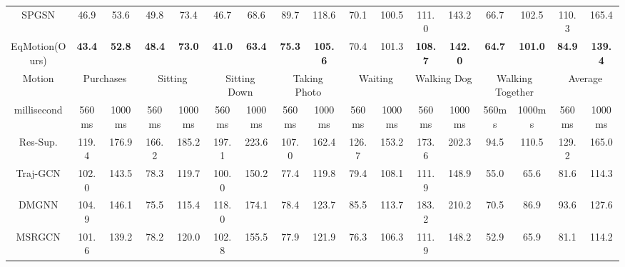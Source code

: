 \documentclass[10pt,twocolumn,letterpaper]{article}
\begin{document}
\begin{table*}[ht]
{\begin{tabular}{c|cc|cc|cc|cc|cc|cc|cc|cc}
SPGSN &46.9 &53.6& 49.8& {73.4}& 46.7 &68.6& 89.7& 118.6& 70.1& 100.5& 111.0& {143.2}& 66.7& 102.5& 110.3& 165.4 \\
EqMotion(Ours)  &\textbf{43.4} &\textbf{52.8}& \textbf{48.4}& \textbf{73.0}& \textbf{41.0} &\textbf{63.4}& \textbf{75.3}&\textbf{105.6}&70.4&101.3&\textbf{108.7}&\textbf{142.0}&\textbf{64.7}&\textbf{101.0} &\textbf{84.9}&\textbf{139.4}\\\hline
Motion          & \multicolumn{2}{c|}{Purchases}  & \multicolumn{2}{c|}{Sitting}    & \multicolumn{2}{c|}{Sitting Down} & \multicolumn{2}{c|}{Taking Photo} & \multicolumn{2}{c|}{Waiting}    & \multicolumn{2}{c|}{Walking Dog}  & \multicolumn{2}{c|}{Walking Together} & \multicolumn{2}{c}{Average}     \\ \hline
millisecond        & 560ms         & 1000ms         & 560ms         & 1000ms         & 560ms          & 1000ms         & 560ms          & 1000ms         & 560ms         & 1000ms         & 560ms          & 1000ms         & 560ms            & 1000ms           & 560ms          & 1000ms         \\ \hline
Res-Sup.          & 119.4         & 176.9          & 166.2         & 185.2          & 197.1          & 223.6          & 107.0          & 162.4          & 126.7         & 153.2          & 173.6          & 202.3          & 94.5            & 110.5            & 129.2        & 165.0          \\
Traj-GCN                & 102.0         & 143.5          & 78.3          & 119.7          &   {100.0}          &   {150.2}          &   {77.4}           &   {119.8}          & 79.4          & 108.1          & 111.9          & 148.9          & 55.0             &   {65.6}             & 81.6           & 114.3          \\
DMGNN              & 104.9         & 146.1          &   {75.5}          &   {115.4}          & 118.0          & 174.1          & 78.4           & 123.7          & 85.5         & 113.7          & 183.2          & 210.2          & 70.5             & 86.9            & 93.6          & 127.6          \\
MSRGCN                &   {101.6}         &   {139.2}          & 78.2          & 120.0          & 102.8          & 155.5          & 77.9           & 121.9          &   {76.3}          &   {106.3}          &   {111.9}          &   {148.2}          &   {52.9}             & 65.9             &   {81.1}           &   {114.2}          \\



\end{tabular}}
\end{table*}
\end{document}
